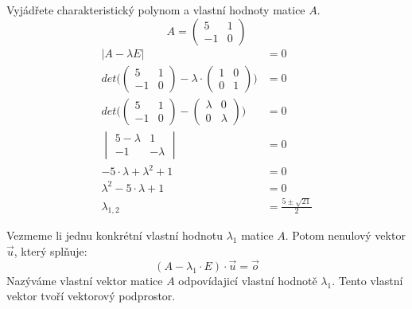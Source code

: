 \begin{example}
    Vyjádřete charakteristický polynom a vlastní hodnoty matice $A$.
    \[A=
    \begin{pmatrix}
        5 & 1\\
        -1 & 0
    \end{pmatrix}
    \]
    \begin{align*}
        |A - \lambda E| &= 0\\
        det \Bigg(
        \begin{pmatrix}
            5 & 1\\
            -1 & 0
        \end{pmatrix} - \lambda \cdot
        \begin{pmatrix}
            1 & 0\\
            0 & 1
        \end{pmatrix} \Bigg ) &= 0 \\
        det \Bigg(
        \begin{pmatrix}
            5 & 1\\
            -1 & 0
        \end{pmatrix} -
        \begin{pmatrix}
            \lambda & 0\\
            0 & \lambda
        \end{pmatrix} \Bigg ) &= 0 \\
        \begin{vmatrix}
            5 - \lambda & 1\\
            -1 & - \lambda
        \end{vmatrix} &= 0 \\
        -5 \cdot \lambda + \lambda^2 + 1 &= 0\\
        \lambda^2 -5 \cdot \lambda + 1 &= 0\\
        \lambda_{1,2} &= \frac{5 \pm \sqrt{21}}{2}
    \end{align*}
\end{example}

\begin{definition}
    Vezmeme li jednu konkrétní vlastní hodnotu $\lambda_1$ matice $A$.
    Potom nenulový vektor $\vec{u}$, který splňuje:
    $$(A - \lambda_1 \cdot E) \cdot \vec{u} = \vec{o}$$
    Nazýváme vlastní vektor matice $A$ odpovídajicí vlastní hodnotě $\lambda_1$.
    Tento vlastní vektor tvoří vektorový podprostor.
\end{definition}


